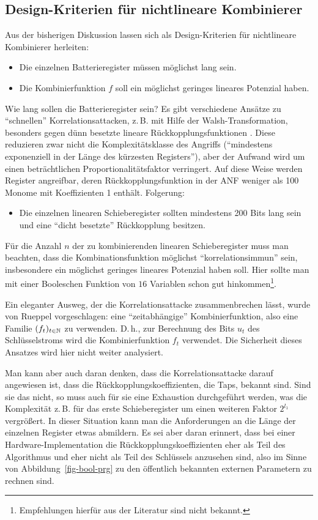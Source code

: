 \begin{refsegment}
\subsection{Design-Kriterien für nichtlineare Kombinierer}

Aus der bisherigen Diskussion lassen sich als Design-Kriterien für
nichtlineare Kombinierer herleiten:
\begin{itemize}
	\item Die einzelnen Batterieregister müssen möglichst lang sein.
	\item Die Kombinierfunktion $f$ soll ein möglichst geringes lineares
        Potenzial haben.
\end{itemize}

Wie lang sollen die Batterieregister sein? Es gibt verschiedene Ansätze zu
"`schnellen"' Korrelationsattacken, z.\,B. mit Hilfe der
Walsh-Transformation, besonders gegen dünn
besetzte lineare Rückkopplungsfunktionen \cite{MeSt1989}.
Diese reduzieren zwar nicht die Komplexitätsklasse des Angriffs
("`mindestens exponenziell in der Länge des kürzesten Registers"'), aber der
Aufwand wird um einen beträchtlichen Proportionalitätsfaktor verringert.
Auf diese Weise werden Register angreifbar, deren Rückkopplungsfunktion
in der ANF weniger als 100 Monome mit Koeffizienten 1 enthält. Folgerung:
\begin{itemize}
	\item Die einzelnen linearen Schieberegister sollten mindestens 200 Bits
	   lang sein und eine "`dicht besetzte"' Rückkopplung besitzen.
\end{itemize}
Für die Anzahl $n$ der zu kombinierenden linearen Schieberegister muss man
beachten, dass die Kombinationsfunktion möglichst "`korrelationsimmun"'
sein, insbesondere ein möglichst geringes lineares Potenzial haben soll.
Hier sollte man mit einer Booleschen Funktion von $16$ Variablen
schon gut hinkommen\footnote{%
  Empfehlungen hierfür aus der Literatur sind nicht bekannt.
}.

Ein eleganter Ausweg, der die Korrelationsattacke zusammenbrechen lässt,
wurde von Rueppel vorgeschlagen: eine "`zeitabhängige"' Kombinierfunktion,
also eine Familie $(f_t)_{t \in \mathbb{N}}$ zu verwenden. D.\,h., zur Berechnung
des Bits $u_t$ des Schlüsselstroms wird die Kombinierfunktion $f_t$
verwendet. Die Sicherheit dieses Ansatzes wird hier nicht weiter
analysiert.

Man kann aber auch daran denken, dass die Korrelationsattacke darauf
angewiesen ist, dass die Rückkopplungskoeffizienten, die Taps, bekannt sind.
Sind sie das nicht, so muss auch für sie eine Exhaustion durchgeführt
werden, was die Komplexität z.\,B. für das erste Schieberegister
um einen weiteren Faktor $2^{l_1}$ vergrößert. In dieser Situation
kann man die Anforderungen an die Länge der einzelnen Register
etwas abmildern. Es sei aber daran erinnert, dass bei einer
Hardware-Implementation die Rückkopplungskoeffizienten eher als
Teil des Algorithmus und eher nicht als Teil des Schlüssels anzusehen
sind, also im Sinne von Abbildung~\ref{fig-bool-prg} zu den
öffentlich bekannten externen Parametern zu rechnen sind.


\end{refsegment}
